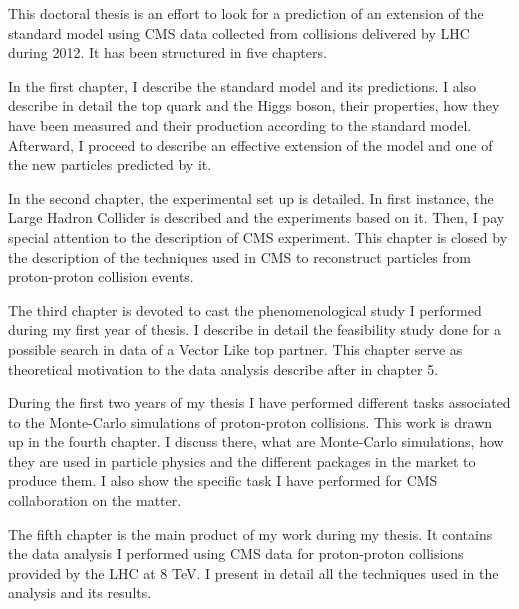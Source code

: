 This doctoral thesis is an effort to look for a prediction of an extension of the standard model using CMS data collected from collisions delivered by LHC during 2012. It has been structured in five chapters.

In the first chapter, I describe the standard model and its predictions. I also describe in detail the top quark and the Higgs boson, their properties, how they have been measured and their production according to the standard model. Afterward, I proceed to describe an effective extension of the model and one of the new particles predicted by it. 

In the second chapter, the experimental set up is detailed. In first instance, the Large Hadron Collider is described and the experiments based on it. Then, I pay special attention to the description of CMS experiment. This chapter is closed by the description of the techniques used in CMS to reconstruct particles from proton-proton collision events. 

The third chapter is devoted to cast the phenomenological study I performed during my first year of thesis. I describe in detail the feasibility study done for a possible search in data of a Vector Like top partner. This chapter serve as theoretical motivation to the data analysis describe after in chapter 5.

During the first two years of my thesis I have performed different tasks associated to the Monte-Carlo simulations of proton-proton collisions. This work is drawn up in the fourth chapter. I discuss there, what are Monte-Carlo simulations, how they are used in particle physics and the different packages in the market to produce them. I also show the specific task I have performed for CMS collaboration on the matter.

The fifth chapter is the main product of my work during my thesis. It contains the data analysis I performed using CMS data for proton-proton collisions provided by the LHC at 8 TeV. I present in detail all the techniques used in the analysis and its results.